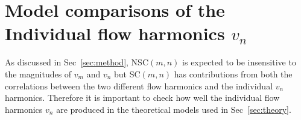 \appendix
\section{Model comparisons of the Individual flow harmonics $v_n$}
\label{sec:vn}
As discussed in Sec~\ref{sec:method}, NSC$(m,n)$ is expected to be insensitive to the magnitudes of $v_{m}$ and $v_{n}$ but SC$(m,n)$ has contributions from both the correlations between the two different flow harmonics and the individual $v_{n}$ harmonics. Therefore it is important to check how well the individual flow harmonics $v_n$ are produced in the theoretical models used in Sec~\ref{sec:theory}.

\begin{figure}[h]
            \begin{center}

\end{center}
\end{figure}
